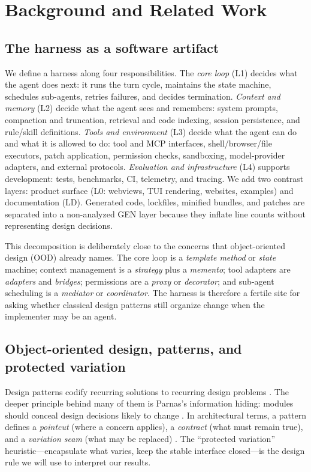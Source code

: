 \documentclass[sigconf,review]{acmart}
\begin{document}
\section{Background and Related Work}
\label{sec:background}

\subsection{The harness as a software artifact}

We define a harness along four responsibilities. The \emph{core loop} (L1) decides what the agent does next: it runs the turn cycle, maintains the state machine, schedules sub-agents, retries failures, and decides termination. \emph{Context and memory} (L2) decide what the agent sees and remembers: system prompts, compaction and truncation, retrieval and code indexing, session persistence, and rule/skill definitions. \emph{Tools and environment} (L3) decide what the agent can do and what it is allowed to do: tool and MCP interfaces, shell/browser/file executors, patch application, permission checks, sandboxing, model-provider adapters, and external protocols. \emph{Evaluation and infrastructure} (L4) supports development: tests, benchmarks, CI, telemetry, and tracing. We add two contrast layers: product surface (L0: webviews, TUI rendering, websites, examples) and documentation (LD). Generated code, lockfiles, minified bundles, and patches are separated into a non-analyzed GEN layer because they inflate line counts without representing design decisions.

This decomposition is deliberately close to the concerns that object-oriented design (OOD) already names. The core loop is a \emph{template method} or \emph{state} machine; context management is a \emph{strategy} plus a \emph{memento}; tool adapters are \emph{adapters} and \emph{bridges}; permissions are a \emph{proxy} or \emph{decorator}; and sub-agent scheduling is a \emph{mediator} or \emph{coordinator}. The harness is therefore a fertile site for asking whether classical design patterns still organize change when the implementer may be an agent.

\subsection{Object-oriented design, patterns, and protected variation}

Design patterns codify recurring solutions to recurring design problems \citep{gof1994}. The deeper principle behind many of them is Parnas's information hiding: modules should conceal design decisions likely to change \citep{parnas1972}. In architectural terms, a pattern defines a \emph{pointcut} (where a concern applies), a \emph{contract} (what must remain true), and a \emph{variation seam} (what may be replaced) \citep{fielding2000,posa2000}. The ``protected variation'' heuristic---encapsulate what varies, keep the stable interface closed---is the design rule we will use to interpret our results.
\end{document}
